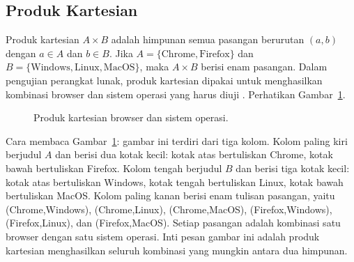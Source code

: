 \documentclass[11pt,a4paper]{article}
\begin{document}
\subsection{Produk Kartesian}

Produk kartesian $A \times B$ adalah himpunan semua pasangan berurutan $(a,b)$ dengan $a \in A$ dan $b \in B$. Jika $A=\{\text{Chrome},\text{Firefox}\}$ dan $B=\{\text{Windows},\text{Linux},\text{MacOS}\}$, maka $A \times B$ berisi enam pasangan. Dalam pengujian perangkat lunak, produk kartesian dipakai untuk menghasilkan kombinasi browser dan sistem operasi yang harus diuji \cite{silberschatz}. Perhatikan Gambar~\ref{fig:produk-kartesian}.

\begin{figure}[H]
	\centering
	\caption{Produk kartesian browser dan sistem operasi.}
	\label{fig:produk-kartesian}
\end{figure}

Cara membaca Gambar~\ref{fig:produk-kartesian}: gambar ini terdiri dari tiga kolom. Kolom paling kiri berjudul $A$ dan berisi dua kotak kecil: kotak atas bertuliskan Chrome, kotak bawah bertuliskan Firefox. Kolom tengah berjudul $B$ dan berisi tiga kotak kecil: kotak atas bertuliskan Windows, kotak tengah bertuliskan Linux, kotak bawah bertuliskan MacOS. Kolom paling kanan berisi enam tulisan pasangan, yaitu (Chrome,Windows), (Chrome,Linux), (Chrome,MacOS), (Firefox,Windows), (Firefox,Linux), dan (Firefox,MacOS). Setiap pasangan adalah kombinasi satu browser dengan satu sistem operasi. Inti pesan gambar ini adalah produk kartesian menghasilkan seluruh kombinasi yang mungkin antara dua himpunan.
\end{document}
